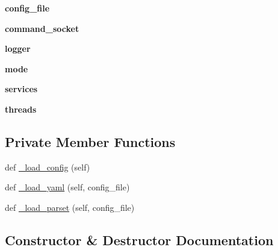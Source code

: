 \begin{DoxyCompactItemize}
{\bfseries config\+\_\+file}
\item 
\mbox{\label{classdarc_1_1darc__master_1_1_d_a_r_c_master_a31164848f8e2d92e6ab9059c03a908ac}} 
{\bfseries command\+\_\+socket}
\item 
\mbox{\label{classdarc_1_1darc__master_1_1_d_a_r_c_master_afc37066d555ff11450b9c873ac24b725}} 
{\bfseries logger}
\item 
\mbox{\label{classdarc_1_1darc__master_1_1_d_a_r_c_master_ad38dc8a9a2f4740cae4d077ec41a3020}} 
{\bfseries mode}
\item 
\mbox{\label{classdarc_1_1darc__master_1_1_d_a_r_c_master_aa96292051ceb2230f5850501a31d3c9b}} 
{\bfseries services}
\item 
\mbox{\label{classdarc_1_1darc__master_1_1_d_a_r_c_master_ac9c00da8065f748aa78eddc045bef12c}} 
{\bfseries threads}
\end{DoxyCompactItemize}
\subsection*{Private Member Functions}
\begin{DoxyCompactItemize}
\item 
def \mbox{\hyperlink{classdarc_1_1darc__master_1_1_d_a_r_c_master_ac50d0ce04a289c4db41a65212efe0ea4}{\+\_\+load\+\_\+config}} (self)
\item 
def \mbox{\hyperlink{classdarc_1_1darc__master_1_1_d_a_r_c_master_a168d2c658d0d916f2d9a8db6c573fec5}{\+\_\+load\+\_\+yaml}} (self, config\+\_\+file)
\item 
def \mbox{\hyperlink{classdarc_1_1darc__master_1_1_d_a_r_c_master_a8adf1a5faacc28a10f432a505122685f}{\+\_\+load\+\_\+parset}} (self, config\+\_\+file)
\end{DoxyCompactItemize}


\subsection{Constructor \& Destructor Documentation}
\mbox{\label{classdarc_1_1darc__master_1_1_d_a_r_c_master_a795bbbd3a6e7da9ba38dabb30071ccaa}} 
